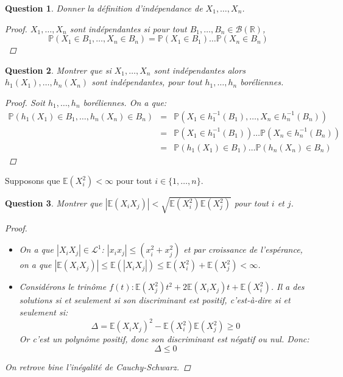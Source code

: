 \documentclass{article}
\theoremstyle{plain}
\newtheorem{question}{Question}
\begin{document}
\begin{question}
	Donner la définition d'indépendance de $X_1, \dots, X_n$.
	\begin{proof}
		$X_1, \dots, X_n$ sont indépendantes si pour tout $B_1, \dots, B_n \in \mathscr{B} (\mathbb{R})$,
		\begin{equation*}
			\mathbb{P} (X_1 \in B_1, \dots, X_n \in B_n) = \mathbb{P} (X_1 \in B_1) \dots \mathbb{P} (X_n \in B_n)
		\end{equation*}
	\end{proof}
\end{question}

\begin{question}
	Montrer que si $X_1, \dots, X_n$ sont indépendantes alors $h_1 (X_1), \dots, h_n (X_n)$ sont indépendantes, pour tout $h_1, \dots, h_n$ boréliennes.

	\begin{proof}
		Soit $h_1, \dots, h_n$ boréliennes. On a que:
		\begin{eqnarray*}
			\mathbb{P} (h_1 (X_1) \in B_1, \dots, h_n (X_n) \in B_n) &=& \mathbb{P} (X_1 \in h_1^{-1} (B_1), \dots, X_n \in h_n^{-1} (B_n)) \\
			&=& \mathbb{P} (X_1 \in h_1^{-1} (B_1)) \dots \mathbb{P} (X_n \in h_n^{-1} (B_n)) \\
			&=& \mathbb{P} (h_1 (X_1) \in B_1) \dots \mathbb{P} (h_n (X_n) \in B_n)
		\end{eqnarray*}
	\end{proof}
\end{question}

Supposons que $\mathbb{E} (X_i^2) < \infty$ pour tout $i \in \{1, \dots, n\}$.

\begin{question}
	Montrer que $|\mathbb{E} (X_iX_j)| < \sqrt{\mathbb{E} (X_i^2) \mathbb{E} (X_j^2)}$ pour tout $i$ et $j$.
	\begin{proof}
		\begin{itemize}
			\item On a que $|X_iX_j| \in \mathscr{L}^1$: $|x_ix_j| \leq (x_i^2 + x_j^2)$ et par croissance de l'espérance,
			      on a que $|\mathbb{E} (X_iX_j)| \leq \mathbb{E} (|X_iX_j|) \leq \mathbb{E} (X_i^2) + \mathbb{E} (X_j^2) < \infty$.
			\item Considérons le trinôme $f(t): \mathbb{E}(X_j^2)t^2 + 2\mathbb{E}(X_iX_j)t + \mathbb{E}(X_i^2)$. Il a des solutions si et seulement si son discriminant est positif, c'est-à-dire si et seulement si:
			      \begin{equation*}
				      \Delta = \mathbb{E}(X_iX_j)^2 - \mathbb{E}(X_i^2)\mathbb{E}(X_j^2) \geq 0
			      \end{equation*}
			      Or c'est un polynôme positif, donc son discriminant est négatif ou nul. Donc:
			      \begin{equation*}
				      \Delta \leq 0
			      \end{equation*}
		\end{itemize}

		On retrove bine l'inégalité de Cauchy-Schwarz.
	\end{proof}
\end{question}
\end{document}
